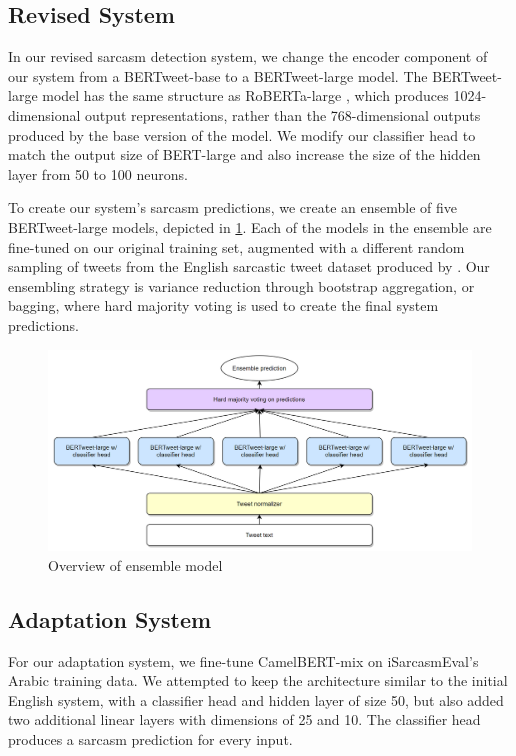 \documentclass[11pt]{article}
\begin{document}
\subsection{Revised System}

In our revised sarcasm detection system, we change the encoder component of our system from a BERTweet-base to a BERTweet-large model. The BERTweet-large model has the same structure as RoBERTa-large \citealp{devlin2018bert}, which produces 1024-dimensional output representations, rather than the 768-dimensional outputs produced by the base version of the model. We modify our classifier head to match the output size of BERT-large and also increase the size of the hidden layer from 50 to 100 neurons. 

To create our system’s sarcasm predictions, we create an ensemble of five BERTweet-large models, depicted in \ref{fig:overview-ensemble-model}. Each of the models in the ensemble are fine-tuned on our original training set, augmented with a different random sampling of tweets from the English sarcastic tweet dataset produced by \citealp{Ptcek2014SarcasmDO}. Our ensembling strategy is variance reduction through bootstrap aggregation, or bagging, where hard majority voting is used to create the final system predictions.

\begin{figure}[h!]
    \includegraphics[width=.5\textwidth]{Picture8.png}
    \caption{Overview of ensemble model}
    \label{fig:overview-ensemble-model}
\end{figure}

\subsection{Adaptation System}
For our adaptation system, we fine-tune CamelBERT-mix \citealp{inoue2021interplay} on iSarcasmEval’s Arabic training data. We attempted to keep the architecture similar to the initial English system, with a classifier head and hidden layer of size 50, but also added two additional linear layers with dimensions of 25 and 10. The classifier head produces a sarcasm prediction for every input.
\end{document}

